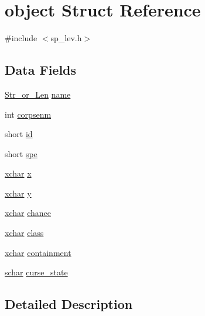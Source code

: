 \hypertarget{structobject}{\section{object Struct Reference}
\label{structobject}
}


{\ttfamily \#include $<$sp\+\_\+lev.\+h$>$}

\subsection*{Data Fields}
\begin{DoxyCompactItemize}
\item 
\hyperlink{sp__lev_8h_ac575b18cce85a1027632cac53c2c42ac}{Str\+\_\+or\+\_\+\+Len} \hyperlink{structobject_acce2482cb9701001d8f378d3bfbdb8f6}{name}
\item 
int \hyperlink{structobject_af0d57d60659d214f46dee12f33858b4e}{corpsenm}
\item 
short \hyperlink{structobject_a89b27835790711d028e57faf65818b57}{id}
\item 
short \hyperlink{structobject_ad788b20b1a3ad90f77344c4c6d7ecb09}{spe}
\item 
\hyperlink{global_8h_a2043b7d01ce89f4ee2fa6c345a752d32}{xchar} \hyperlink{structobject_a33ab5ab578cd508e56751a631c232844}{x}
\item 
\hyperlink{global_8h_a2043b7d01ce89f4ee2fa6c345a752d32}{xchar} \hyperlink{structobject_ae2675b3ffe08b822d9e74e97fa663a39}{y}
\item 
\hyperlink{global_8h_a2043b7d01ce89f4ee2fa6c345a752d32}{xchar} \hyperlink{structobject_ad3bcfb453ef8a5f6d3d98f1e6a7272f1}{chance}
\item 
\hyperlink{global_8h_a2043b7d01ce89f4ee2fa6c345a752d32}{xchar} \hyperlink{structobject_a5450b696036bcd71d636be3e98508a72}{class}
\item 
\hyperlink{global_8h_a2043b7d01ce89f4ee2fa6c345a752d32}{xchar} \hyperlink{structobject_a787b3970195160628997c28e50e448f2}{containment}
\item 
\hyperlink{config_8h_a0fd9ce9d735064461bebfe6037026093}{schar} \hyperlink{structobject_a2a59500b53e0d54f2ee8b74139a984d5}{curse\+\_\+state}
\end{DoxyCompactItemize}


\subsection{Detailed Description}


